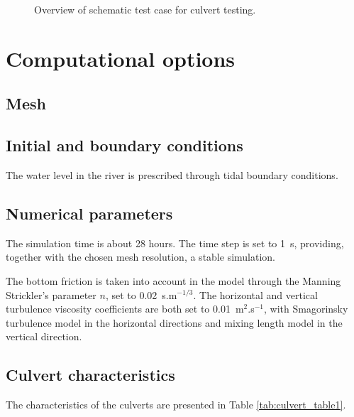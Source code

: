 \begin{figure}[h]
\begin{center}
\end{center}
\caption{Overview of schematic test case for culvert testing.}
\label{fig:culvert_figure1}
\end{figure}

\section{Computational options}

\subsection{Mesh}

\subsection{Initial and boundary conditions}
The water level in the river is prescribed through tidal boundary conditions.

\subsection{Numerical parameters}

The simulation time is about 28 hours.
The time step is set to 1~s, providing, together with the chosen mesh resolution, a stable simulation.

The bottom friction is taken into account in the model through the Manning Strickler’s parameter $n$, set to 0.02~s.m$^{-1/3}$.
The horizontal and vertical turbulence viscosity coefficients are both set to 0.01~m$^2$.s$^{-1}$,
with Smagorinsky turbulence model in the horizontal directions and mixing length
model in the vertical direction.

\subsection{Culvert characteristics}
The characteristics of the culverts are presented in Table \ref{tab:culvert_table1}.

